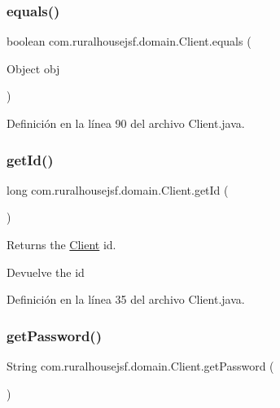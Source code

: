 \subsubsection{\texorpdfstring{equals()}{equals()}}
{\footnotesize\ttfamily boolean com.\+ruralhousejsf.\+domain.\+Client.\+equals (\begin{DoxyParamCaption}\item[{Object}]{obj }\end{DoxyParamCaption})}



Definición en la línea 90 del archivo Client.\+java.

\mbox{\label{classcom_1_1ruralhousejsf_1_1domain_1_1_client_a522bbbbe3b397983a76056b4350126df}} 
\subsubsection{\texorpdfstring{getId()}{getId()}}
{\footnotesize\ttfamily long com.\+ruralhousejsf.\+domain.\+Client.\+get\+Id (\begin{DoxyParamCaption}{ }\end{DoxyParamCaption})}

Returns the \mbox{\hyperlink{classcom_1_1ruralhousejsf_1_1domain_1_1_client}{Client}} id.

\begin{DoxyReturn}{Devuelve}
the id 
\end{DoxyReturn}


Definición en la línea 35 del archivo Client.\+java.

\mbox{\label{classcom_1_1ruralhousejsf_1_1domain_1_1_client_a5ecd4e7fd82dec1d7348730379be6b54}} 
\subsubsection{\texorpdfstring{getPassword()}{getPassword()}}
{\footnotesize\ttfamily String com.\+ruralhousejsf.\+domain.\+Client.\+get\+Password (\begin{DoxyParamCaption}{ }\end{DoxyParamCaption})}

